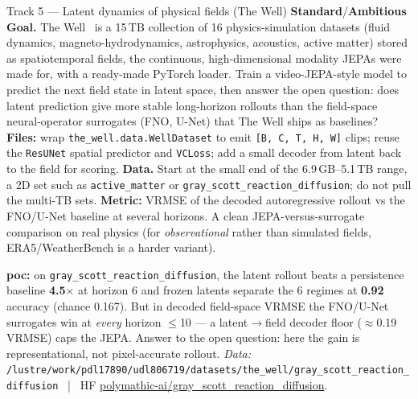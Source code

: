 \documentclass{article}
\newcommand{\code}[1]{\texttt{\small #1}}
\newcommand{\diffmed}{\colorbox{ebamber!18}{\textcolor{ebamber}{\small\bfseries Standard}}}
\newcommand{\diffhard}{\colorbox{ebred!15}{\textcolor{ebred}{\small\bfseries Ambitious}}}
\begin{document}
\begin{trackbox}{Track 5 --- Latent dynamics of physical fields (The Well) \hfill \diffmed{}/\diffhard{}}
\textbf{Goal.} The Well~\citep{the_well} is a 15\,TB collection of 16
physics-simulation datasets (fluid dynamics, magneto-hydrodynamics, astrophysics,
acoustics, active matter) stored as spatiotemporal fields, the continuous,
high-dimensional modality JEPAs were made for, with a ready-made PyTorch loader.
Train a video-JEPA-style model to predict the next field state in latent space, then
answer the open question: does latent prediction give more stable long-horizon
rollouts than the field-space neural-operator surrogates (FNO, U-Net) that The Well
ships as baselines? \textbf{Files:} wrap \code{the\_well.data.WellDataset} to emit
\code{[B, C, T, H, W]} clips; reuse the \code{ResUNet} spatial predictor and
\code{VCLoss}; add a small decoder from latent back to the field for scoring.
\textbf{Data.} Start at the small end of the 6.9\,GB--5.1\,TB range, a 2D set such
as \code{active\_matter} or \code{gray\_scott\_reaction\_diffusion}; do not pull the
multi-TB sets. \textbf{Metric:} VRMSE of the decoded autoregressive rollout vs the
FNO/U-Net baseline at several horizons. A clean JEPA-versus-surrogate comparison on
real physics (for \emph{observational} rather than simulated fields,
ERA5/WeatherBench is a harder variant).

\smallskip
\textbf{poc:} on \code{gray\_scott\_reaction\_diffusion}, the latent rollout beats a
persistence baseline \textbf{4.5$\times$} at horizon 6 and frozen latents separate
the 6 regimes at \textbf{0.92} accuracy (chance 0.167). But in decoded field-space
VRMSE the FNO/U-Net surrogates win at \emph{every} horizon $\le$10 --- a
latent$\to$field decoder floor ($\approx$0.19 VRMSE) caps the JEPA. Answer to the
open question: here the gain is representational, not pixel-accurate rollout.
\emph{Data:} \code{/lustre/work/pdl17890/udl806719/datasets/the\_well/gray\_scott\_reaction\_diffusion}
~|~ HF \href{https://huggingface.co/datasets/polymathic-ai/gray_scott_reaction_diffusion}{polymathic-ai/gray\_scott\_reaction\_diffusion}.
\end{trackbox}
\end{document}

